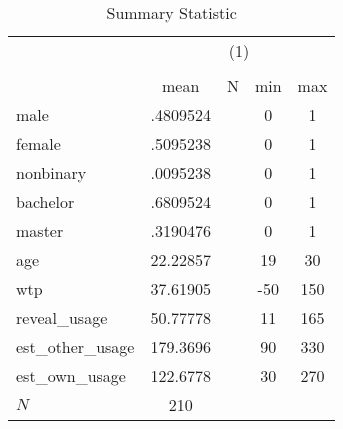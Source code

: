 \begin{table}[htbp]\centering
\def\sym#1{\ifmmode^{#1}\else\(^{#1}\)\fi}
\caption{Summary Statistic}
\begin{tabular}{l*{1}{cccc}}
\hline\hline
            &\multicolumn{4}{c}{(1)}                            \\
            &\multicolumn{4}{c}{}                               \\
            &        mean&           N&         min&         max\\
\hline
male        &    .4809524&            &           0&           1\\
female      &    .5095238&            &           0&           1\\
nonbinary   &    .0095238&            &           0&           1\\
bachelor    &    .6809524&            &           0&           1\\
master      &    .3190476&            &           0&           1\\
age         &    22.22857&            &          19&          30\\
wtp         &    37.61905&            &         -50&         150\\
reveal\_usage&    50.77778&            &          11&         165\\
est\_other\_usage&    179.3696&            &          90&         330\\
est\_own\_usage&    122.6778&            &          30&         270\\
\hline
\(N\)       &         210&            &            &            \\
\hline\hline
\end{tabular}
\end{table}
